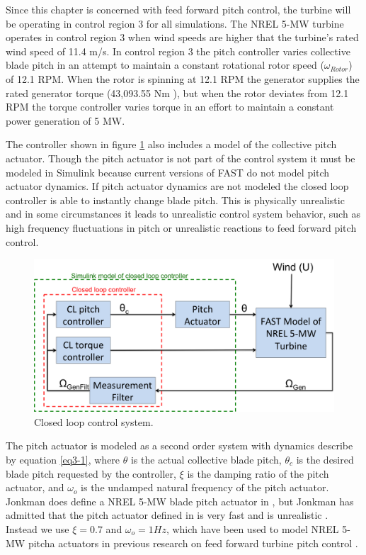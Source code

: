 Since this chapter is concerned with feed forward pitch control, the turbine will be operating in control region 3 for all simulations. The NREL 5-MW turbine operates in control region 3 when wind speeds are higher that the turbine's rated wind speed of 11.4 m/s. In control region 3 the pitch controller varies collective blade pitch in an attempt to maintain a constant rotational rotor speed ($\omega_{Rotor}$) of 12.1 RPM. When the rotor is spinning at 12.1 RPM the generator supplies the rated generator torque (43,093.55 Nm ), but when the rotor deviates from 12.1 RPM the torque controller varies torque in an effort to maintain a constant power generation of 5 MW. 

The controller shown in figure \ref{fig3-9} also includes a model of the collective pitch actuator. Though the pitch actuator is not part of the control system it must be modeled in Simulink because current versions of FAST do not model pitch actuator dynamics. If pitch actuator dynamics are not modeled the closed loop controller is able to instantly change blade pitch. This is physically unrealistic and in some circumstances it leads to unrealistic control system behavior, such as high frequency fluctuations in pitch or unrealistic reactions to feed forward pitch control.

 \begin{figure}[htbp]
	\centering
		\includegraphics[width=\linewidth]{Figures/ch3Figures/fig3-9.png}
		
	\caption{Closed loop control system.}
	\label{fig3-9}
\end{figure}

The pitch actuator is modeled as a second order system with dynamics describe by equation \ref{eq3-1}, where  $\theta$  is the actual collective blade pitch, $\theta_c$ is the desired blade pitch requested by the controller, $\xi$ is the damping ratio of the pitch actuator, and $\omega_o$ is the undamped natural frequency of the pitch actuator. Jonkman does define a NREL 5-MW blade pitch actuator in \cite{jonkman2009}, but Jonkman has admitted that the pitch actuator defined in \cite{jonkman2009} is very fast and is unrealistic \cite{jonkman2014}. Instead we use $\xi = 0.7$ and $\omega_o = 1Hz$, which have been used to model NREL 5-MW pitcha actuators in previous research on feed forward turbine pitch control \cite{dunne2011,dunne2012}. 

